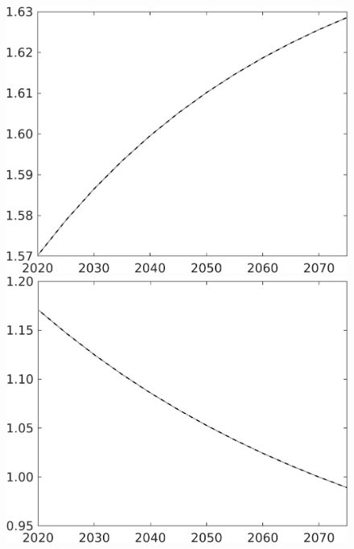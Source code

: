 \documentclass[12pt]{article}
\begin{document}
\begin{figure}[h!!]
\begin{minipage}[]{0.32\textwidth}
	\end{minipage}	
	\begin{minipage}[]{0.32\textwidth}
		\includegraphics[width=1\textwidth]{../../codding_model/own_basedOnFried/optimalPol_010922_revision/figures/all_13Sept22/CompTaul_LFBAU_Reg0_pn_spillover0_nsk1_xgr0_knspil1_sep1_countec0_GovRev0_etaa0.79_lgd0.png}
	\end{minipage}	
	\begin{minipage}[]{0.32\textwidth}
		\includegraphics[width=1\textwidth]{../../codding_model/own_basedOnFried/optimalPol_010922_revision/figures/all_13Sept22/CompTaul_LFBAU_Reg0_pg_spillover0_nsk1_xgr0_knspil1_sep1_countec0_GovRev0_etaa0.79_lgd0.png}

\end{minipage}
\end{figure}
\end{document}
